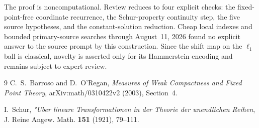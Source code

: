 \documentclass[11pt]{article}
\begin{document}
The proof is noncomputational.  Review reduces to four explicit checks: the
fixed-point-free coordinate recurrence, the Schur-property continuity step,
the five source hypotheses, and the constant-solution reduction.  Cheap local
indexes and bounded primary-source searches through August~11, 2026 found no
explicit answer to the source prompt by this construction.  Since the shift
map on the $\ell_1$ ball is classical, novelty is asserted only for its
Hammerstein encoding and remains subject to expert review.

\begin{thebibliography}{9}
C.~S.~Barroso and D.~O'Regan,
\emph{Measures of Weak Compactness and Fixed Point Theory},
arXiv:math/0310422v2 (2003), Section~4.

I.~Schur,
\emph{"Uber lineare Transformationen in der Theorie der unendlichen Reihen},
J. Reine Angew. Math. \textbf{151} (1921), 79--111.
\end{thebibliography}
\end{document}
